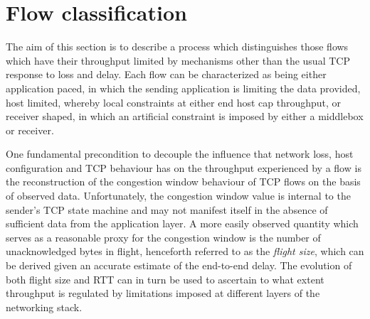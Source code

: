 \section{Flow classification}
\label{section:rate:flow}

The aim of this section is to describe a process which distinguishes those flows which have their throughput limited by mechanisms other than the usual \ac{TCP} response to loss and delay.
Each flow can be characterized as being either application paced, in which the sending application is limiting the data provided, host limited, whereby local constraints at either end host cap throughput, or receiver shaped, in which an artificial constraint is imposed by either a middlebox or receiver.

One fundamental precondition to decouple the influence that network loss, host configuration and \ac{TCP} behaviour has on the throughput experienced by a flow is the reconstruction of the congestion window behaviour of \ac{TCP} flows on the basis of observed data. 
Unfortunately, the congestion window value is internal to the sender's \ac{TCP} state machine and may not manifest itself in the absence of sufficient data from the application layer. 
A more easily observed quantity which serves as a reasonable proxy for the congestion window is the number of unacknowledged bytes in flight, henceforth referred to as the \textit{flight size}, which can be derived given an accurate estimate of the end-to-end delay.
The evolution of both flight size and \ac{RTT} can in turn be used to ascertain to what extent throughput is regulated by limitations imposed at different layers of the networking stack.

